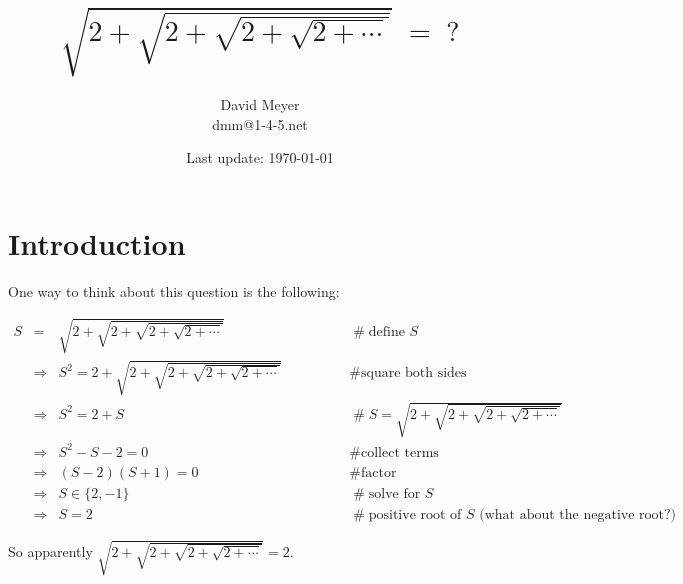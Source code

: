 \documentclass{article}
\title{$\sqrt{2 + \sqrt{2 + \sqrt{2 + \sqrt{2 + \cdots}}}}  \; = \; ?$}
\author{David Meyer \\ dmm@1-4-5.net}
\date{Last update: \today}
\theoremstyle{definition}
\begin{document}
\maketitle

\section{Introduction}
One way to think about this question is the following: 

\begin{equation*}
\begin{array}{llll}
S
&=&  \sqrt{2 + \sqrt{2 + \sqrt{2 + \sqrt{2 + \cdots}}}} 
				&\qquad \qquad \mathrel{\#} \text{define $S$} \\
[5pt]
&\Rightarrow& S^2 = 2 + \sqrt{2 + \sqrt{2 + \sqrt{2 + \sqrt{2 + \cdots}}}} 
				&\qquad \qquad \mathrel{\#} \text{square both sides} \\
[2pt]
&\Rightarrow& S^2 = 2 + S 
				&\qquad \qquad \mathrel{\#} S = \sqrt{2 + \sqrt{2 + \sqrt{2 + \sqrt{2 + \cdots}}}}  \\
[7pt]
&\Rightarrow& S^2 -S - 2 = 0 
				&\qquad \qquad \mathrel{\#} \text{collect terms} \\
[5pt]
&\Rightarrow& (S - 2)(S + 1) = 0
				&\qquad \qquad \mathrel{\#} \text{factor} \\
[5pt]
&\Rightarrow& S \in \{2,-1\}
				&\qquad \qquad \mathrel{\#} \text{solve for $S$} \\
[5pt]
&\Rightarrow& S = 2
				&\qquad \qquad \mathrel{\#} \text{positive root of $S$ (what about the negative root?)} 

\end{array}
\end{equation*}

\smallskip
\noindent
So apparently $ \sqrt{2 + \sqrt{2 + \sqrt{2 + \sqrt{2 + \cdots}}}}  = 2$.


%
%
%
%
%
% 
% 
%
%
\end{document}
